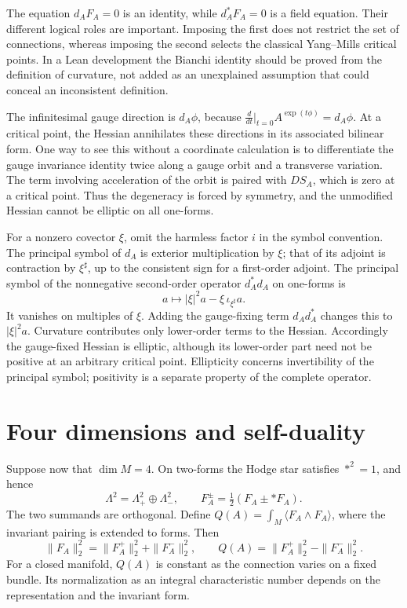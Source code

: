 The equation $d_AF_A=0$ is an identity, while $d_A^*F_A=0$ is a field
equation.  Their different logical roles are important.  Imposing the first
does not restrict the set of connections, whereas imposing the second
selects the classical Yang--Mills critical points.  In a Lean development the
Bianchi identity should be proved from the definition of curvature, not
added as an unexplained assumption that could conceal an inconsistent
definition.

The infinitesimal gauge direction is $d_A\phi$, because
$\frac{d}{dt}|_{t=0} A^{\exp(t\phi)}=d_A\phi$.  At a critical point,
the Hessian annihilates these directions in its associated bilinear form.
One way to see this without a coordinate calculation is to differentiate
the gauge invariance identity twice along a gauge orbit and a transverse
variation.  The term involving acceleration of the orbit is paired with
$DS_A$, which is zero at a critical point.  Thus the degeneracy is forced by
symmetry, and the unmodified Hessian cannot be elliptic on all one-forms.

For a nonzero covector $\xi$, omit the harmless factor $i$ in the symbol
convention.  The principal symbol of $d_A$ is exterior multiplication by
$\xi$; that of its adjoint is contraction by $\xi^\sharp$, up to the
consistent sign for a first-order adjoint.  The principal symbol of the
nonnegative second-order operator $d_A^*d_A$ on one-forms is
\[
 a\longmapsto |\xi|^2a-\xi\,\iota_{\xi^\sharp}a.
\]
It vanishes on multiples of $\xi$.  Adding the gauge-fixing term
$d_Ad_A^*$ changes this to $|\xi|^2a$.  Curvature contributes only
lower-order terms to the Hessian.  Accordingly the gauge-fixed Hessian is
elliptic, although its lower-order part need not be positive at an arbitrary
critical point.  Ellipticity concerns invertibility of the principal symbol;
positivity is a separate property of the complete operator.

\section{Four dimensions and self-duality}

Suppose now that $\dim M=4$.  On two-forms the Hodge star satisfies
$*^2=1$, and hence
\[
 \Lambda^2=\Lambda^2_+\oplus\Lambda^2_-,\qquad
 F_A^\pm=\tfrac12(F_A\pm *F_A).
\]
The two summands are orthogonal.  Define
$Q(A)=\int_M\langle F_A\wedge F_A\rangle$, where the invariant
pairing is extended to forms.  Then
\begin{equation}
 \|F_A\|_2^2=\|F_A^+\|_2^2+\|F_A^-\|_2^2,
 \qquad Q(A)=\|F_A^+\|_2^2-\|F_A^-\|_2^2.
 \label{eq:energy-topology}
\end{equation}
For a closed manifold, $Q(A)$ is constant as the connection varies on a
fixed bundle.  Its normalization as an integral characteristic number depends
on the representation and the invariant form.

